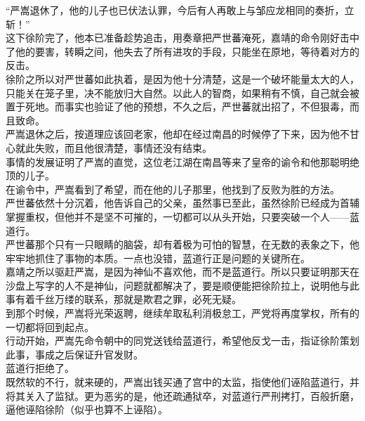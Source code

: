 \begin{multicols}{\theparacolNo}
“严嵩退休了，他的儿子也已伏法认罪，今后有人再敢上与邹应龙相同的奏折，立斩！”\\

这下徐阶完了，他本已准备趁势追击，用奏章把严世蕃淹死，嘉靖的命令刚好击中了他的要害，转瞬之间，他失去了所有进攻的手段，只能坐在原地，等待着对方的反击。\\

徐阶之所以对严世蕃如此执着，是因为他十分清楚，这是一个破坏能量太大的人，只能关在笼子里，决不能放归大自然。以此人的智商，如果稍有不慎，自己就会被置于死地。而事实也验证了他的预想，不久之后，严世蕃就出招了，不但狠毒，而且致命。\\

严嵩退休之后，按道理应该回老家，他却在经过南昌的时候停了下来，因为他不甘心就此失败，而且他很清楚，事情还没有结束。\\

事情的发展证明了严嵩的直觉，这位老江湖在南昌等来了皇帝的谕令和他那聪明绝顶的儿子。\\

在谕令中，严嵩看到了希望，而在他的儿子那里，他找到了反败为胜的方法。\\

严世蕃依然十分沉着，他告诉自己的父亲，虽然事已至此，虽然徐阶已经成为首辅掌握重权，但他并不是坚不可摧的，一切都可以从头开始，只要突破一个人——蓝道行。\\

严世蕃那个只有一只眼睛的脑袋，却有着极为可怕的智慧，在无数的表象之下，他牢牢地抓住了事物的本质。一点也没错，蓝道行正是问题的关键所在。\\

嘉靖之所以驱赶严嵩，是因为神仙不喜欢他，而不是蓝道行。所以只要证明那天在沙盘上写字的人不是神仙，问题就都解决了，要是顺便能把徐阶拉上，说明他与此事有着千丝万缕的联系，那就是欺君之罪，必死无疑。\\

到那个时候，严嵩将光荣返聘，继续牟取私利消极怠工，严党将再度掌权，所有的一切都将回到起点。\\

行动开始，严嵩先命令朝中的同党送钱给蓝道行，希望他反戈一击，指证徐阶策划此事，事成之后保证升官发财。\\

蓝道行拒绝了。\\

既然软的不行，就来硬的，严嵩出钱买通了宫中的太监，指使他们诬陷蓝道行，并将其关入了监狱。更为恶劣的是，他还疏通狱卒，对蓝道行严刑拷打，百般折磨，逼他诬陷徐阶（似乎也算不上诬陷）。\\


\end{multicols}
